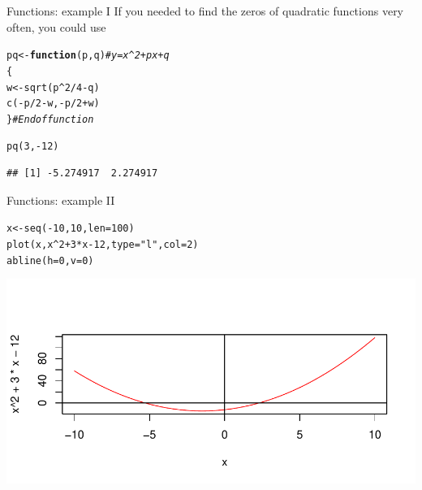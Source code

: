 \documentclass[xcolor=table,      handout ,    xcolor=dvipsnames]{beamer}\usepackage[]{graphicx}\usepackage[]{color}
\makeatletter
\newcommand{\hlnum}[1]{\textcolor[rgb]{0,0,0}{#1}}
\newcommand{\hlstr}[1]{\textcolor[rgb]{0.545,0.137,0.137}{#1}}
\newcommand{\hlcom}[1]{\textcolor[rgb]{0,0.392,0}{\textit{#1}}}
\newcommand{\hlopt}[1]{\textcolor[rgb]{0,0,0}{#1}}
\newcommand{\hlstd}[1]{\textcolor[rgb]{0,0,0}{#1}}
\newcommand{\hlkwa}[1]{\textcolor[rgb]{1,0,0}{\textbf{#1}}}
\newcommand{\hlkwb}[1]{\textcolor[rgb]{0,0,0}{#1}}
\newcommand{\hlkwc}[1]{\textcolor[rgb]{1,0,1}{#1}}
\newcommand{\hlkwd}[1]{\textcolor[rgb]{0,0,1}{#1}}
\newenvironment{kframe}{%
 \def\at@end@of@kframe{}%
 \ifinner\ifhmode%
  \def\at@end@of@kframe{\end{minipage}}%
  \begin{minipage}{\columnwidth}%
 \fi\fi%
 \def\FrameCommand##1{\hskip\@totalleftmargin \hskip-\fboxsep
 \colorbox{shadecolor}{##1}\hskip-\fboxsep
     \hskip-\linewidth \hskip-\@totalleftmargin \hskip\columnwidth}%
 \MakeFramed {\advance\hsize-\width
   \@totalleftmargin\z@ \linewidth\hsize
   \@setminipage}}%
 {\par\unskip\endMakeFramed%
 \at@end@of@kframe}
\newenvironment{knitrout}{}{} %
\makeatother
\begin{document}
\begin{frame}[fragile]{Functions: example I}
If you needed to find the zeros of quadratic functions very often, you could use
\begin{knitrout}
\color{fgcolor}\begin{kframe}
\begin{alltt}
\hlstd{pq} \hlkwb{<-} \hlkwa{function}\hlstd{(}\hlkwc{p}\hlstd{,}\hlkwc{q}\hlstd{)} \hlcom{# y = x^2 + px + q}
              \hlstd{\{}
              \hlstd{w} \hlkwb{<-} \hlkwd{sqrt}\hlstd{( p}\hlopt{^}\hlnum{2} \hlopt{/} \hlnum{4} \hlopt{-} \hlstd{q )}
              \hlkwd{c}\hlstd{(}\hlopt{-}\hlstd{p}\hlopt{/}\hlnum{2}\hlopt{-}\hlstd{w,} \hlopt{-}\hlstd{p}\hlopt{/}\hlnum{2}\hlopt{+}\hlstd{w)}
              \hlstd{\}} \hlcom{# End of function}

\hlkwd{pq}\hlstd{(}\hlnum{3}\hlstd{,} \hlopt{-}\hlnum{12}\hlstd{)}
\end{alltt}
\begin{verbatim}
## [1] -5.274917  2.274917
\end{verbatim}
\end{kframe}
\end{knitrout}
\end{frame}


\begin{frame}[fragile]{Functions: example II}
\begin{knitrout}
\color{fgcolor}\begin{kframe}
\begin{alltt}
\hlstd{x} \hlkwb{<-} \hlkwd{seq}\hlstd{(}\hlopt{-}\hlnum{10}\hlstd{,} \hlnum{10}\hlstd{,} \hlkwc{len}\hlstd{=}\hlnum{100}\hlstd{)}
\hlkwd{plot}\hlstd{(x,  x}\hlopt{^}\hlnum{2} \hlopt{+}\hlnum{3}\hlopt{*}\hlstd{x} \hlopt{-}\hlnum{12}\hlstd{,} \hlkwc{type}\hlstd{=}\hlstr{"l"}\hlstd{,} \hlkwc{col}\hlstd{=}\hlnum{2}\hlstd{)}
\hlkwd{abline}\hlstd{(}\hlkwc{h}\hlstd{=}\hlnum{0}\hlstd{,} \hlkwc{v}\hlstd{=}\hlnum{0}\hlstd{)}
\end{alltt}
\end{kframe}

{\centering \includegraphics[width=\textwidth]{./fig/pqfunplot-1} 

}



\end{knitrout}
\end{frame}
\end{document}
